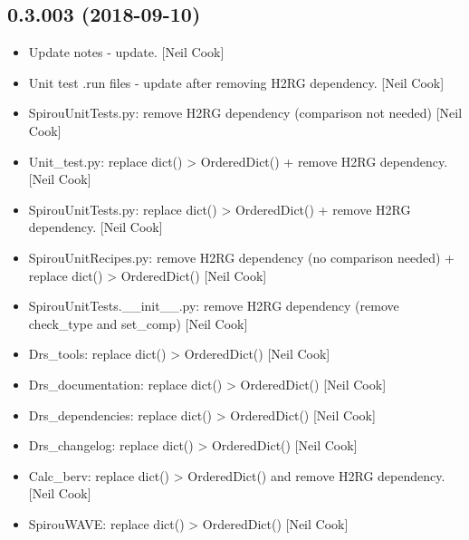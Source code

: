 \documentclass[a4paper,10pt,english]{report}
\begin{document}
\subsection{0.3.003 (2018-09-10)}
\label{\detokenize{misc/changelog:id330}}\begin{itemize}
\item {} 
Update notes - update. {[}Neil Cook{]}

\item {} 
Unit test .run files - update after removing H2RG dependency. {[}Neil
Cook{]}

\item {} 
SpirouUnitTests.py: remove H2RG dependency (comparison not needed)
{[}Neil Cook{]}

\item {} 
Unit\_test.py: replace dict() \textendash{}\textgreater{} OrderedDict() + remove H2RG
dependency. {[}Neil Cook{]}

\item {} 
SpirouUnitTests.py: replace dict() \textendash{}\textgreater{} OrderedDict() + remove H2RG
dependency. {[}Neil Cook{]}

\item {} 
SpirouUnitRecipes.py: remove H2RG dependency (no comparison needed) +
replace dict() \textendash{}\textgreater{} OrderedDict() {[}Neil Cook{]}

\item {} 
SpirouUnitTests.\_\_init\_\_.py: remove H2RG dependency (remove check\_type
and set\_comp) {[}Neil Cook{]}

\item {} 
Drs\_tools: replace dict() \textendash{}\textgreater{} OrderedDict() {[}Neil Cook{]}

\item {} 
Drs\_documentation: replace dict() \textendash{}\textgreater{} OrderedDict() {[}Neil Cook{]}

\item {} 
Drs\_dependencies: replace dict() \textendash{}\textgreater{} OrderedDict() {[}Neil Cook{]}

\item {} 
Drs\_changelog: replace dict() \textendash{}\textgreater{} OrderedDict() {[}Neil Cook{]}

\item {} 
Calc\_berv: replace dict() \textendash{}\textgreater{} OrderedDict() and remove H2RG
dependency. {[}Neil Cook{]}

\item {} 
SpirouWAVE: replace dict() \textendash{}\textgreater{} OrderedDict() {[}Neil Cook{]}


\end{itemize}
\end{document}
